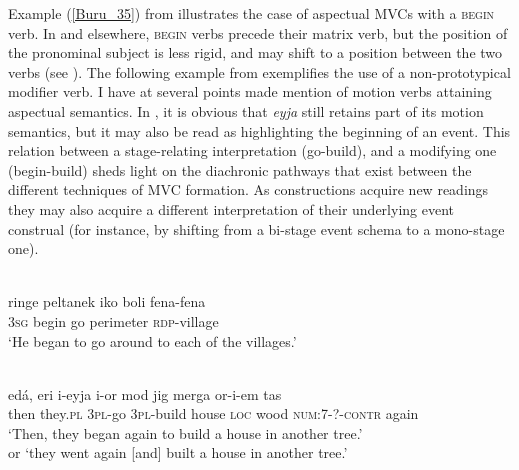 Example (\ref{Buru_35}) from  illustrates the case of aspectual MVCs with a \textsc{begin} verb. In  and elsewhere, \textsc{begin} verbs precede their matrix verb, but the position of the pronominal subject is less rigid, and may shift to a position between the two verbs (see \citealt[215]{grimes1991buru}). The following example from  exemplifies the use of a non-prototypical modifier verb. I have at several points made mention of motion verbs attaining aspectual semantics. In , it is obvious that \textit{eyja} still retains part of its motion semantics, but it may also be read as highlighting the beginning of an event. This relation between a stage-relating interpretation (go-build), and a modifying one (begin-build) sheds light on the diachronic pathways that exist between the different techniques of MVC formation. As constructions acquire new readings they may also acquire a different interpretation of their underlying event construal (for instance, by shifting from a bi-stage event schema to a mono-stage one).

\ea \label{Buru_35}
\\
\gll ringe peltanek iko boli fena-fena \\
3\textsc{sg} begin go perimeter \textsc{rdp}-village \\
\glft `He began to go around to each of the villages.'\\ 
\z

\ea \label{Moskona_48}
\\
\gll edá, eri i-eyja i-or mod jig merga or-i-em tas \\
then they.\textsc{pl} 3\textsc{pl}-go 3\textsc{pl}-build house \textsc{loc} wood \textsc{num}:7-?-\textsc{contr} again \\
\glft `Then, they began again to build a house in another tree.’ \\
or `they went again [and] built a house in another tree.’\\ 
\z

